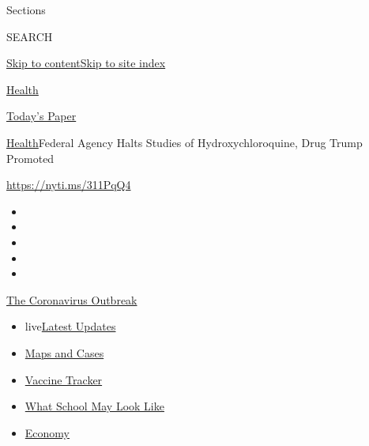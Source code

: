 Sections

SEARCH

\protect\hyperlink{site-content}{Skip to
content}\protect\hyperlink{site-index}{Skip to site index}

\href{https://www.nytimes.com/section/health}{Health}

\href{https://myaccount.nytimes.com/auth/login?response_type=cookie\&client_id=vi}{}

\href{https://www.nytimes.com/section/todayspaper}{Today's Paper}

\href{/section/health}{Health}\textbar{}Federal Agency Halts Studies of
Hydroxychloroquine, Drug Trump Promoted

\url{https://nyti.ms/311PqQ4}

\begin{itemize}
\item
\item
\item
\item
\item
\end{itemize}

\href{https://www.nytimes.com/news-event/coronavirus?action=click\&pgtype=Article\&state=default\&region=TOP_BANNER\&context=storylines_menu}{The
Coronavirus Outbreak}

\begin{itemize}
\tightlist
\item
  live\href{https://www.nytimes.com/2020/08/02/world/coronavirus-updates.html?action=click\&pgtype=Article\&state=default\&region=TOP_BANNER\&context=storylines_menu}{Latest
  Updates}
\item
  \href{https://www.nytimes.com/interactive/2020/us/coronavirus-us-cases.html?action=click\&pgtype=Article\&state=default\&region=TOP_BANNER\&context=storylines_menu}{Maps
  and Cases}
\item
  \href{https://www.nytimes.com/interactive/2020/science/coronavirus-vaccine-tracker.html?action=click\&pgtype=Article\&state=default\&region=TOP_BANNER\&context=storylines_menu}{Vaccine
  Tracker}
\item
  \href{https://www.nytimes.com/interactive/2020/07/29/us/schools-reopening-coronavirus.html?action=click\&pgtype=Article\&state=default\&region=TOP_BANNER\&context=storylines_menu}{What
  School May Look Like}
\item
  \href{https://www.nytimes.com/live/2020/07/31/business/stock-market-today-coronavirus?action=click\&pgtype=Article\&state=default\&region=TOP_BANNER\&context=storylines_menu}{Economy}
\end{itemize}

